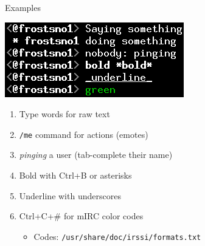 \documentclass{beamer}
\begin{document}
\begin{frame}{Examples}
	\begin{center}
	\includegraphics[scale=1.75]{chatting.png}
	\end{center}
	\begin{enumerate}
		\item Type words for raw text
		\item \texttt{/me} command for actions (emotes)
		\item \emph{pinging} a user (tab-complete their name)
		\item Bold with Ctrl+B or asterisks
		\item Underline with underscores
		\item Ctrl+C+\# for mIRC color codes
		\begin{itemize}
			\item Codes: \texttt{/usr/share/doc/irssi/formats.txt}
		\end{itemize}
	\end{enumerate}
\end{frame}
\end{document}
